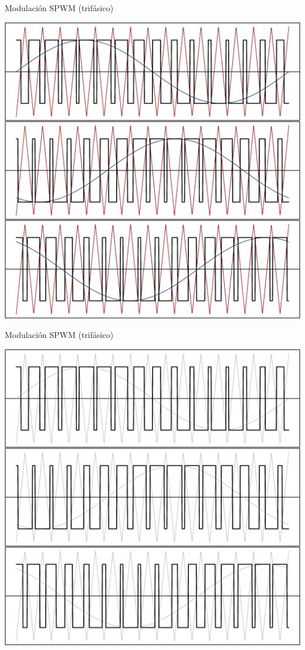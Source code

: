 \documentclass[aspectratio=169, usenames,svgnames,dvipsnames]{beamer}
\begin{document}
\begin{frame}[label={sec:org9153e76}]{Modulación SPWM (trifásico)}
\begin{center}
\includegraphics[height=0.9\textheight]{../figs/SPWMTrifasico.pdf}
\end{center}
\end{frame}

\begin{frame}[label={sec:org45e39c5}]{Modulación SPWM (trifásico)}
\begin{center}
\includegraphics[height=0.9\textheight]{../figs/SPWMTrifasico_shaded.pdf}
\end{center}
\end{frame}
\end{document}
